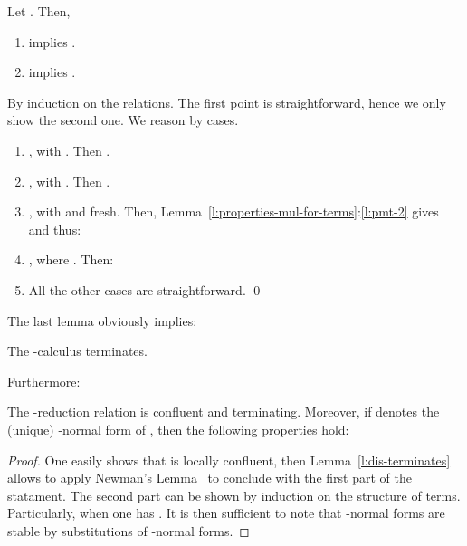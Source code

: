 \documentclass{LMCS}
\renewcommand{\>}{\rightarrow}
\newcommand{\ignore}[1]{}
\begin{document}
\begin{lem}
\label{l:dm-decreases}
Let . Then, 
\begin{enumerate}[\rm(1)]
\item  implies .
\item  implies .
\end{enumerate}
\end{lem}

\proof
By induction on the relations. The first point is straightforward, hence
we only show the second one. We reason by cases. 
\begin{enumerate}[]
\item , with . 
Then . 
 
\item , with . 
Then . 

\item , with 
and  fresh. Then, Lemma~\ref{l:properties-mul-for-terms}:\ref{l:pmt-2}
gives  and  thus:
 
       
       
\item , where . Then:
      

\ignore{
\item , where . Then
      
}
       
\item All the other cases are straightforward. 
\qed
\end{enumerate}


The last lemma obviously implies:

\begin{lem}
\label{l:dis-terminates}
The -calculus terminates.
\end{lem}

Furthermore:

\begin{lem}
\label{l:uniqueness-j}
The -reduction relation is confluent and terminating. Moreover,
if  denotes the (unique) -normal form of , then the following
properties hold:

\end{lem}

\begin{proof}
One easily shows that  is locally confluent, then
Lemma~\ref{l:dis-terminates} allows to apply Newman's Lemma~\cite{Terese03} to conclude with the first
part of the statament.  The second part can be shown by induction on
the structure of terms. Particularly, when  one has
. It is then sufficient to
note that -normal forms are stable by substitutions of
-normal forms.
\end{proof}
\end{document}
